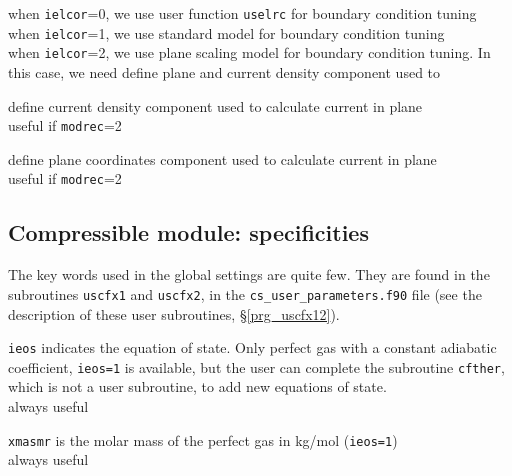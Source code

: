 {when \texttt{ielcor}=0, we use user function \texttt{uselrc} for boundary condition tuning\\
when \texttt{ielcor}=1, we use standard model for boundary condition tuning\\
when \texttt{ielcor}=2, we use plane scaling model for boundary condition tuning. In this case, we need
define plane and current density component used to}

{define current density component used to calculate current in plane\\
useful if \texttt{modrec}=2}

{define plane coordinates component used to calculate current in plane\\
useful if \texttt{modrec}=2}

\subsection{Compressible module: specificities}

The key words used in the global settings are quite few. They are
found in the subroutines \texttt{uscfx1} and \texttt{uscfx2}, in
the \texttt{cs\_user\_parameters.f90} file (see the
description of these user subroutines, \S\ref{prg_uscfx12}).

{\texttt{ieos} indicates the equation of state. Only perfect gas with a constant adiabatic coefficient,
\texttt{ieos=1} is available, but the user can complete the subroutine
\texttt{cfther}, which is not a user subroutine, to add new equations of state.\\
always useful
}

{\texttt{xmasmr} is the molar mass of the perfect gas in kg/mol (\texttt{ieos=1})\\
always useful
}

